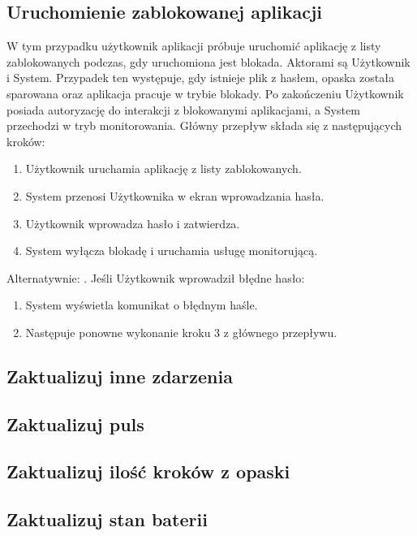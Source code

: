 \subsection{Uruchomienie zablokowanej aplikacji}
W tym przypadku użytkownik aplikacji próbuje uruchomić aplikację z listy zablokowanych podczas, gdy uruchomiona jest blokada. Aktorami są Użytkownik i System. Przypadek ten występuje, gdy istnieje plik z hasłem, opaska została sparowana oraz aplikacja pracuje w trybie blokady. Po zakończeniu Użytkownik posiada autoryzację do interakcji z blokowanymi aplikacjami, a System przechodzi w tryb monitorowania. Główny przepływ składa się z następujących kroków:
\begin{enumerate}
    \item Użytkownik uruchamia aplikację z listy zablokowanych.
    \item System przenosi Użytkownika w ekran wprowadzania hasła.
    \item Użytkownik wprowadza hasło i zatwierdza.
    \item System wyłącza blokadę i uruchamia usługę monitorującą.
\end{enumerate}
Alternatywnie:
\newline\newline
{}. Jeśli Użytkownik wprowadził błędne hasło:
\begin{enumerate}[leftmargin=3\parindent]
    \item System wyświetla komunikat o błędnym haśle.
    \item Następuje ponowne wykonanie kroku 3 z głównego przepływu.
\end{enumerate}

\subsection{Zaktualizuj inne zdarzenia}

\subsection{Zaktualizuj puls}

\subsection{Zaktualizuj ilość kroków z opaski}

\subsection{Zaktualizuj stan baterii}

